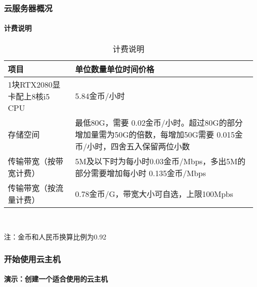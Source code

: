 \documentclass[10pt]{beamer}
\begin{document}
    \begin{frame}
        \frametitle{云服务器概况}
            \framesubtitle{计费说明}

            {\small
            \begin{table}[h]
                {\centering
                \caption{计费说明}\label{tab:tab1}
                    \begin{tabular}{|p{}|p{}|}
                        \hline
                        项目 & 单位数量单位时间价格 \\
                        \hline
                        1块RTX2080显卡配上8核i5 CPU & 5.84金币/小时 \\
                        \hline
                        存储空间 & 最低80G，需要 0.02金币/小时。超过80G的部分增加量需为50G的倍数，每增加50G需要 0.015金币/小时，四舍五入保留两位小数 \\
                        \hline
                        传输带宽（按带宽计费） & 5M及以下时为每小时0.03金币/Mbps，多出5M的部分需要增加每小时 0.135金币/Mbps \\
                        \hline
                        传输带宽（按流量计费） & 0.78金币/G，带宽大小可自选，上限100Mpbs \\
                        \hline
                    \end{tabular} \\
                }
            \end{table}
            {\tiny \qquad \qquad 注：金币和人民币换算比例为0.92}
            }

    \end{frame}

    \begin{frame}
        \frametitle{开始使用云主机}
            \framesubtitle{演示：创建一个适合使用的云主机}
            \href{}{}

    \end{frame}
\end{document}
